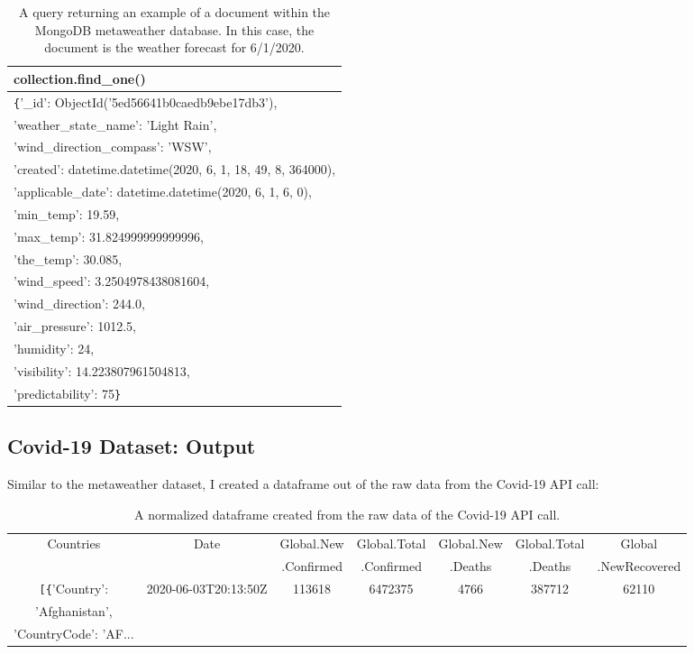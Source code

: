 \documentclass[]{article}
\begin{document}
\begin{table}[!ht]
	\begin{center}
		\caption{A query returning an example of a document within the MongoDB metaweather database.  In this case, the document is the weather forecast for 6/1/2020.}
		\label{tab:table1}
		\begin{tabular}{|l|} 
			\hline
			\textbf{collection.find\_one()} \\
			\hline
			\verb|{|'\_id': ObjectId('5ed56641b0caedb9ebe17db3'),\\
				'weather\_state\_name': 'Light Rain',\\
				'wind\_direction\_compass': 'WSW',\\
				'created': datetime.datetime(2020, 6, 1, 18, 49, 8, 364000),\\
				'applicable\_date': datetime.datetime(2020, 6, 1, 6, 0),\\
				'min\_temp': 19.59,\\
				'max\_temp': 31.824999999999996,\\
				'the\_temp': 30.085,\\
				'wind\_speed': 3.2504978438081604,\\
				'wind\_direction': 244.0,\\
				'air\_pressure': 1012.5,\\
				'humidity': 24,\\
				'visibility': 14.223807961504813,\\
				'predictability': 75\verb|}|\\

			\hline
		\end{tabular}
	\end{center}
\end{table}

\subsection{Covid-19 Dataset: Output}
Similar to the metaweather dataset, I created a dataframe out of the raw data from the Covid-19 API call:
\begin{table}[!ht]
	\begin{center}
		\caption{A normalized dataframe created from the raw data of the Covid-19 API call.}
		\label{tab:table1}
		\begin{tabular}{|c|c|c|c|c|c|c|}
			\hline
			Countries&Date&Global.New&Global.Total&Global.New&Global.Total& Global\\
			&&.Confirmed&.Confirmed&.Deaths&.Deaths& .NewRecovered\\
			\hline
			\verb|[{|'Country': &	2020-06-03T20:13:50Z&	113618&	6472375&	4766&	387712&	62110\\
			 'Afghanistan', &	&&	&&&	\\
			 'CountryCode': 'AF...&	&&&&	&\\
			\hline
		\end{tabular}
	\end{center}
\end{table}
\end{document}
